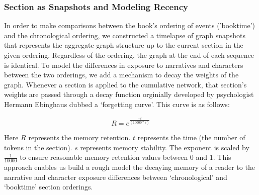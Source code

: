 \subsubsection{Section as Snapshots and Modeling Recency}
In order to make comparisons between the book's ordering of events ('booktime') and the chronological ordering, we constructed a timelapse of graph snapshots that represents the aggregate graph structure up to the current section in the given ordering. Regardless of the ordering, the graph at the end of each sequence is identical. To model the differences in exposure to narratives and characters between the two orderings, we add a mechanism to decay the weights of the graph. Whenever a section is applied to the cumulative network, that section's weights are passed through a decay function orginially developed by psychologist Hermann Ebinghaus dubbed a `forgetting curve'. This curve is as follows:

\begin{equation}
    R = e^{\frac{-t}{(10000*s)}}
\end{equation}

Here $R$ represents the memory retention. $t$ represents the time (the number of tokens in the section). $s$ represents memory stability. The exponent is scaled by $\frac{1}{10000}$ to ensure reasonable memory retention values between $0$ and $1$. This approach enables us build a rough model the decaying memory of a reader to the narrative and character exposure differences between `chronological' and `booktime' section orderings.

